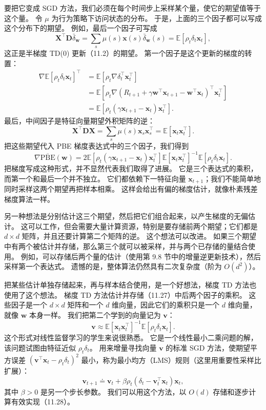 \documentclass[UTF8,12pt,a4paper,fontset=fandol]{ctexart}
\begin{document}
要把它变成 SGD 方法，我们必须在每个时间步上采样某个量，使它的期望值等于这个量。
令 $\mu$ 为行为策略下访问状态的分布。
于是，上面的三个因子都可以写成这个分布下的期望。
例如，最后一个因子可写成
\[
\mathbf{X}^\top\mathbf{D}\bar\delta_{\mathbf{w}}
=\sum_s\mu(s)\mathbf{x}(s)\bar\delta_{\mathbf{w}}(s)
=\mathbb{E}[\rho_t\delta_t\mathbf{x}_t],
\]
这正是半梯度 TD(0) 更新（11.2）的期望。
第一个因子是这个更新的梯度的转置：
\[
\begin{aligned}
\nabla\mathbb{E}[\rho_t\delta_t\mathbf{x}_t]^\top
&=\mathbb{E}\left[\rho_t\nabla\delta_t^\top\mathbf{x}_t^\top\right]\\
&=\mathbb{E}\left[\rho_t\nabla(R_{t+1}+\gamma\mathbf{w}^\top\mathbf{x}_{t+1}-\mathbf{w}^\top\mathbf{x}_t)^\top\mathbf{x}_t^\top\right]\\
&=\mathbb{E}\left[\rho_t(\gamma\mathbf{x}_{t+1}-\mathbf{x}_t)\mathbf{x}_t^\top\right].
\end{aligned}
\]
最后，中间因子是特征向量期望外积矩阵的逆：
\[
\mathbf{X}^\top\mathbf{D}\mathbf{X}
=\sum_s\mu(s)\mathbf{x}_s\mathbf{x}_s^\top
=\mathbb{E}[\mathbf{x}_t\mathbf{x}_t^\top].
\]
把这些期望代入 PBE 梯度表达式中的三个因子，我们得到
\begin{equation}
\nabla\overline{\mathrm{PBE}}(\mathbf{w})
=2\mathbb{E}\left[\rho_t(\gamma\mathbf{x}_{t+1}-\mathbf{x}_t)\mathbf{x}_t^\top\right]
\mathbb{E}\left[\mathbf{x}_t\mathbf{x}_t^\top\right]^{-1}
\mathbb{E}\left[\rho_t\delta_t\mathbf{x}_t\right].
\tag{11.27}
\end{equation}
把梯度写成这种形式，并不显然代表我们取得了进展。
它是三个表达式的乘积，而第一个和最后一个并不独立。
它们都依赖下一特征向量 $\mathbf{x}_{t+1}$；我们不能简单地同时采样这两个期望再把样本相乘。
这样会给出有偏的梯度估计，就像朴素残差梯度算法一样。

另一种想法是分别估计这三个期望，然后把它们组合起来，以产生梯度的无偏估计。
这可以工作，但会需要大量计算资源，特别是要存储前两个期望；它们都是 $d\times d$ 矩阵，并且还要计算第二个矩阵的逆。
这个想法可以改进。
如果三个期望中有两个被估计并存储，那么第三个就可以被采样，并与两个已存储的量结合使用。
例如，可以存储后两个量的估计（使用第 9.8 节中的增量逆更新技术），然后采样第一个表达式。
遗憾的是，整体算法仍然具有二次复杂度（阶为 $O(d^2)$）。

把某些估计单独存储起来，再与样本结合使用，是一个好想法，梯度 TD 方法也使用了这个想法。
梯度 TD 方法估计并存储（11.27）中后两个因子的乘积。
这些因子是一个 $d\times d$ 矩阵和一个 $d$ 维向量，因此它们的乘积只是一个 $d$ 维向量，就像 $\mathbf{w}$ 本身一样。
我们把第二个学到的向量记为 $\mathbf{v}$：
\begin{equation}
\mathbf{v}\approx
\mathbb{E}\left[\mathbf{x}_t\mathbf{x}_t^\top\right]^{-1}\mathbb{E}\left[\rho_t\delta_t\mathbf{x}_t\right].
\tag{11.28}
\end{equation}
这个形式对线性监督学习的学生来说很熟悉。
它是一个线性最小二乘问题的解，该问题试图由特征近似 $\rho_t\delta_t$。
用来增量寻找向量 $\mathbf{v}$ 的标准 SGD 方法，使期望平方误差 $(\mathbf{v}^\top\mathbf{x}_t-\rho_t\delta_t)^2$ 最小，称为最小均方（LMS）规则（这里用重要性采样比扩展）：
\[
\mathbf{v}_{t+1}\doteq \mathbf{v}_t+\beta\rho_t(\delta_t-\mathbf{v}_t^\top\mathbf{x}_t)\mathbf{x}_t,
\]
其中 $\beta>0$ 是另一个步长参数。
我们可以用这个方法，以 $O(d)$ 存储和逐步计算有效实现（11.28）。
\end{document}

